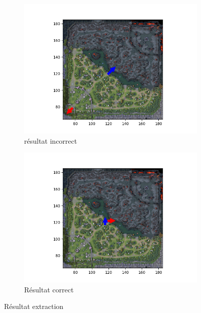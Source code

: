 \begin{figure}[h!]
     \centering
     \begin{subfigure}[b]{0.44\textwidth}
         \centering
         \includegraphics[width=\textwidth]{Images/bad_seq2.png.png}
          \caption{résultat incorrect}
          \label{fig:extraction_bad}
     \end{subfigure}
     \hfill
     \begin{subfigure}[b]{0.44\textwidth}
         \centering
         \includegraphics[width=\textwidth]{Images/good_seq2.png.png}
     \caption{Résultat correct}
     \label{fig:extraction_good}
     \end{subfigure}
     \caption{Résultat extraction}
\end{figure}    


